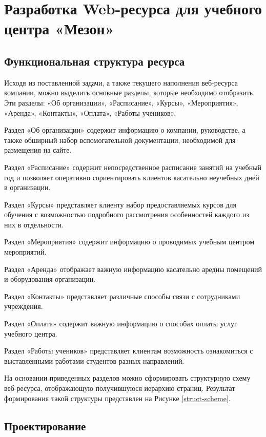 \section{Разработка Web-ресурса для учебного центра «Мезон»}


\subsection{Функциональная структура ресурса}




Исходя из поставленной задачи, а также текущего наполнения веб-ресурса компании, можно выделить основные разделы, которые необходимо отобразить.
Эти разделы: «Об организации», «Расписание», «Курсы», «Мероприятия», «Аренда», «Контакты», «Оплата», «Работы учеников».

Раздел «Об организации» содержит информацию о компании, руководстве, а также обширный набор вспомогательной документации, необходимой для размещения на сайте.

Раздел «Расписание» содержит непосредственное расписание занятий на учебный год и позволяет оперативно сориентировать клиентов касательно неучебных дней в организации.

Раздел «Курсы» представляет клиенту набор предоставляемых курсов для обучения с возможностью подробного рассмотрения особенностей каждого из них в отдельности.

Раздел «Мероприятия» содержит информацию о проводимых учебным центром мероприятий.

Раздел «Аренда» отображает важную информацию касательно аредны помещений и оборудования организации.

Раздел «Контакты» представляет различные способы связи с сотрудниками учреждения.

Раздел «Оплата» содержит важную информацию о способах оплаты услуг учебного центра.

Раздел «Работы учеников» представляет клиентам возможность ознакомиться с выставленными работами студентов разных направлений.

На основании приведенных разделов можно сформировать структурную схему веб-ресурса, отображающую получившуюся иерархию страниц.
Результат формирования такой структуры представлен на Рисунке \ref{struct-scheme}.



\subsection{Проектирование }




\clearpage
